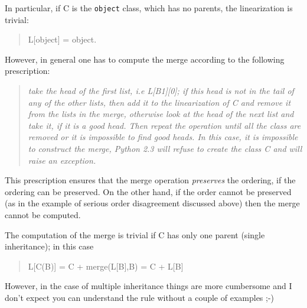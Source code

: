 \documentclass[10pt,a4paper,english]{article}
\begin{document}
In particular, if C is the \texttt{object} class, which has no parents, the
linearization is trivial:
\begin{quote}

L{[}object] = object.
\end{quote}

However, in general one has to compute the merge according to the following 
prescription:
\begin{quote}

\emph{take the head of the first list, i.e L{[}B1]{[}0]; if this head is not in
the tail of any of the other lists, then add it to the linearization
of C and remove it from the lists in the merge, otherwise look at the
head of the next list and take it, if it is a good head.  Then repeat
the operation until all the class are removed or it is impossible to
find good heads.  In this case, it is impossible to construct the
merge, Python 2.3 will refuse to create the class C and will raise an
exception.}
\end{quote}

This prescription ensures that the merge operation \emph{preserves} the
ordering, if the ordering can be preserved.  On the other hand, if the
order cannot be preserved (as in the example of serious order
disagreement discussed above) then the merge cannot be computed.

The computation of the merge is trivial if C has only one parent 
(single inheritance); in this case
\begin{quote}

L{[}C(B)] = C + merge(L{[}B],B) = C + L{[}B]
\end{quote}

However, in the case of multiple inheritance things are more cumbersome
and I don't expect you can understand the rule without a couple of
examples ;-)


\hspace*{\fill}\hrulefill\hspace*{\fill}
\end{document}
